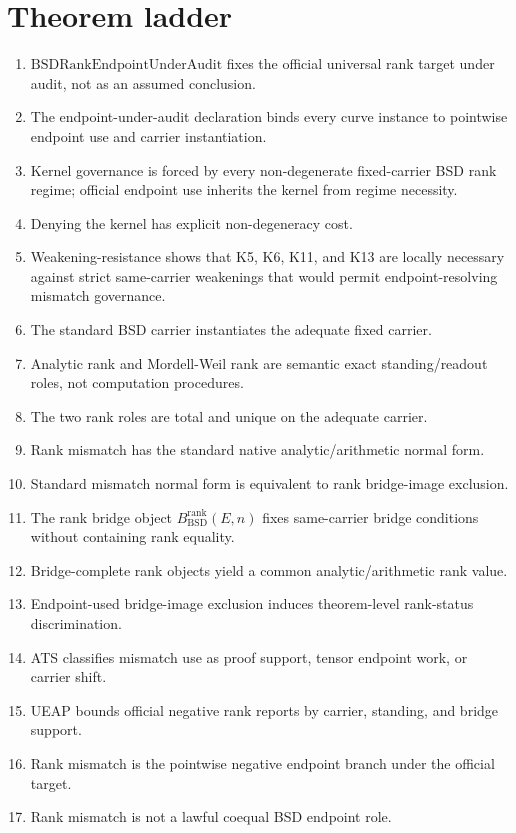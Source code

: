 \documentclass[11pt]{article}
\newcommand{\BSD}{\mathrm{BSD}}
\newcommand{\BsdRankBridge}{B^{\mathrm{rank}}_{\BSD}}
\begin{document}
\section{Theorem ladder}
\begin{enumerate}
\item $\mathrm{BSDRankEndpointUnderAudit}$ fixes the official universal rank target under audit, not as an assumed conclusion.
\item The endpoint-under-audit declaration binds every curve instance to pointwise endpoint use and carrier instantiation.
\item Kernel governance is forced by every non-degenerate fixed-carrier BSD rank regime; official endpoint use inherits the kernel from regime necessity.
\item Denying the kernel has explicit non-degeneracy cost.
\item Weakening-resistance shows that K5, K6, K11, and K13 are locally necessary against strict same-carrier weakenings that would permit endpoint-resolving mismatch governance.
\item The standard BSD carrier instantiates the adequate fixed carrier.
\item Analytic rank and Mordell-Weil rank are semantic exact standing/readout roles, not computation procedures.
\item The two rank roles are total and unique on the adequate carrier.
\item Rank mismatch has the standard native analytic/arithmetic normal form.
\item Standard mismatch normal form is equivalent to rank bridge-image exclusion.
\item The rank bridge object $\BsdRankBridge(E,n)$ fixes same-carrier bridge conditions without containing rank equality.
\item Bridge-complete rank objects yield a common analytic/arithmetic rank value.
\item Endpoint-used bridge-image exclusion induces theorem-level rank-status discrimination.
\item ATS classifies mismatch use as proof support, tensor endpoint work, or carrier shift.
\item UEAP bounds official negative rank reports by carrier, standing, and bridge support.
\item Rank mismatch is the pointwise negative endpoint branch under the official target.
\item Rank mismatch is not a lawful coequal BSD endpoint role.

\end{enumerate}
\end{document}
